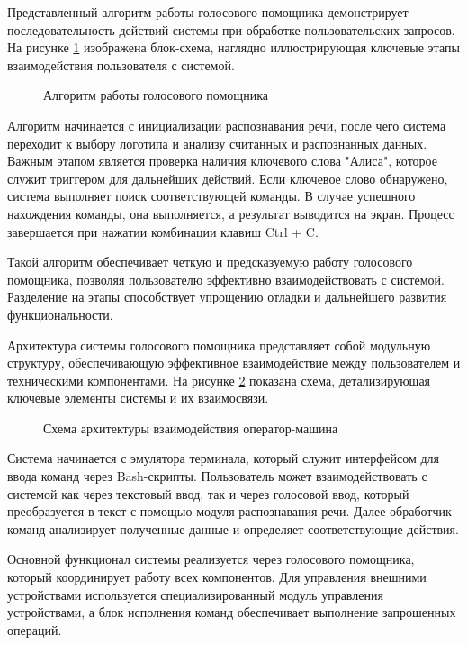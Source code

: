 Представленный алгоритм работы голосового помощника демонстрирует последовательность действий системы при обработке пользовательских запросов. На рисунке \ref{fig:algorithm} изображена блок-схема, наглядно иллюстрирующая ключевые этапы взаимодействия пользователя с системой.

\begin{figure}[H]
	\centering
	\caption{Алгоритм работы голосового помощника}
	\label{fig:algorithm}
\end{figure}

Алгоритм начинается с инициализации распознавания речи, после чего система переходит к выбору логотипа и анализу считанных и распознанных данных. Важным этапом является проверка наличия ключевого слова "Алиса", которое служит триггером для дальнейших действий. Если ключевое слово обнаружено, система выполняет поиск соответствующей команды. В случае успешного нахождения команды, она выполняется, а результат выводится на экран. Процесс завершается при нажатии комбинации клавиш Ctrl + C.

Такой алгоритм обеспечивает четкую и предсказуемую работу голосового помощника, позволяя пользователю эффективно взаимодействовать с системой. Разделение на этапы способствует упрощению отладки и дальнейшего развития функциональности.

Архитектура системы голосового помощника представляет собой модульную структуру, обеспечивающую эффективное взаимодействие между пользователем и техническими компонентами. На рисунке \ref{fig:system_architecture_diagram} показана схема, детализирующая ключевые элементы системы и их взаимосвязи.

\begin{figure}[H]
	\centering
	\caption{Схема архитектуры взаимодействия оператор-машина}
	\label{fig:system_architecture_diagram}
\end{figure}

Система начинается с эмулятора терминала, который служит интерфейсом для ввода команд через Bash-скрипты. Пользователь может взаимодействовать с системой как через текстовый ввод, так и через голосовой ввод, который преобразуется в текст с помощью модуля распознавания речи. Далее обработчик команд анализирует полученные данные и определяет соответствующие действия.

Основной функционал системы реализуется через голосового помощника, который координирует работу всех компонентов. Для управления внешними устройствами используется специализированный модуль управления устройствами, а блок исполнения команд обеспечивает выполнение запрошенных операций.

